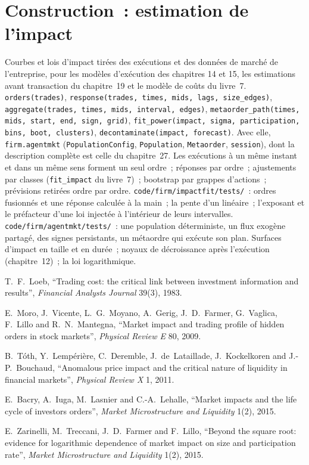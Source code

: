 \section{Construction~: estimation de l'impact}\label{bld:mx:the-empirics-of-price-impact:impactfit}

\begin{build}
 Courbes et lois d'impact tirées des exécutions et des données de marché de l'entreprise, pour les modèles d'exécution des chapitres 14 et 15, les estimations avant transaction du
chapitre~19 et le modèle de coûts du livre~7.
 \texttt{orders(trades)}, \texttt{response(trades, times, mids, lags, size\_edges)},
\texttt{aggregate(trades, times, mids, interval, edges)}, \texttt{metaorder\_path(times, mids, start, end, sign, grid)}, \texttt{fit\_power(impact, sigma, participation, bins, boot, clusters)},
\texttt{decontaminate(impact, forecast)}. Avec elle, \texttt{firm.agentmkt} (\texttt{PopulationConfig}, \texttt{Population}, \texttt{Metaorder},
\texttt{session}), dont la description complète est celle du chapitre~27.
 Les exécutions à un même instant et dans un même sens forment un seul ordre~; réponses par ordre~; ajustements par classes (\texttt{fit\_impact} du livre~7)~; bootstrap par grappes d'actions~;
prévisions retirées ordre par ordre.
 \texttt{code/firm/impactfit/tests/}~: ordres fusionnés et une réponse calculée à la main~; la pente d'un  linéaire~; l'exposant
et le préfacteur d'une loi injectée à l'intérieur de leurs intervalles. \texttt{code/firm/agentmkt/tests/}~: une population déterministe, un flux exogène partagé, des signes persistants,
un métaordre qui exécute son plan.
 Surfaces d'impact en taille et en durée~; noyaux de décroissance après l'exécution (chapitre~12)~; la loi logarithmique.
\end{build}

\begin{omsources}
\item T.~F.~Loeb, ``Trading cost: the critical link between investment information and results'', \emph{Financial Analysts Journal} 39(3), 1983.
\item E.~Moro, J.~Vicente, L.~G.~Moyano, A.~Gerig, J.~D.~Farmer, G.~Vaglica, F.~Lillo and R.~N.~Mantegna, ``Market impact and trading profile of hidden
orders in stock markets'', \emph{Physical Review E} 80, 2009.
\item B.~Tóth, Y.~Lempérière, C.~Deremble, J.~de~Lataillade, J.~Kockelkoren and J.-P.~Bouchaud, ``Anomalous price impact and the critical nature of
liquidity in financial markets'', \emph{Physical Review X} 1, 2011.
\item E.~Bacry, A.~Iuga, M.~Lasnier and C.-A.~Lehalle, ``Market impacts and the life cycle of investors orders'', \emph{Market Microstructure and
Liquidity} 1(2), 2015.
\item E.~Zarinelli, M.~Treccani, J.~D.~Farmer and F.~Lillo, ``Beyond the square root: evidence for logarithmic dependence of market impact on size and
participation rate'', \emph{Market Microstructure and Liquidity} 1(2), 2015.
\end{omsources}

